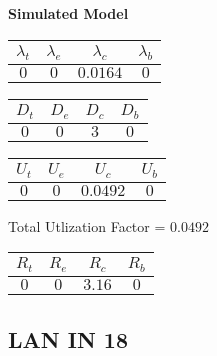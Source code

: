 \documentclass{article}
\begin{document}
\begin{minipage}{0.5\textwidth}
\centering	\textbf{Simulated Model}
\begin{table}[H]
\centering
\begin{tabular}{@{}cccc@{}}
\toprule
$\lambda_t$ & $\lambda_e$ & $\lambda_c$ & $\lambda_b$\\
\midrule
$0$ & $0$ & $0.0164$ & $0$\\
\bottomrule
\end{tabular}
\end{table}
\begin{table}[H]
\centering
\begin{tabular}{@{}cccc@{}}
\toprule
$D_t$ & $D_e$ & $D_c$ & $D_b$\\
\midrule
$0$ & $0$ & $3$ & $0$\\
\bottomrule
\end{tabular}
\end{table}\begin{table}[H]
\centering
\begin{tabular}{@{}cccc@{}}
\toprule
$U_t$ & $U_e$ & $U_c$ & $U_b$\\
\midrule
$0$ & $0$ & $0.0492$ & $0$\\
\bottomrule
\end{tabular}
\end{table}
\centering Total Utlization Factor = $0.0492$
\begin{table}[H]
\centering
\begin{tabular}{@{}cccc@{}}
\toprule
$R_t$ & $R_e$ & $R_c$ & $R_b$\\
\midrule
$0$ & $0$ & $3.16$ & $0$\\
\bottomrule
\end{tabular}
\end{table}
\end{minipage}\subsection{LAN IN 18}
\end{document}
